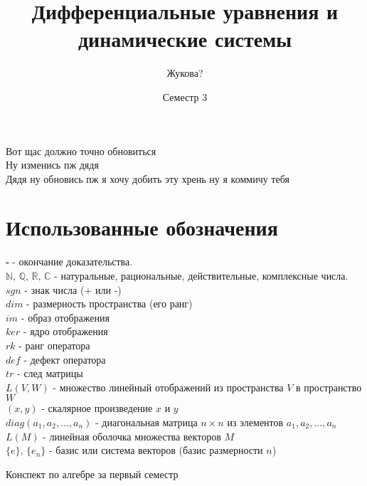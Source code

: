 \documentclass[a4paper]{book}
\title{Дифференциальные уравнения и динамические системы}
\date{Семестр 3}
\author{Жукова?}
\begin{document}
\maketitle
\tableofcontents
\newpage

Вот щас должно точно обновиться\\
Ну изменись пж дядя\\
Дядя ну обновись пж я хочу добить эту хрень ну я коммичу тебя\\
\section{Использованные обозначения}
$\square$ - окончание доказательства. \\
$\mathbb N,\,\mathbb Q,\,\mathbb R,\,\mathbb C$ - натуральные, рациональные,
действительные, комплексные числа.\\
$sgn$ - знак числа (+ или -)\\
$dim$ - размерность пространства (его ранг)\\
$im$ - образ отображения\\
$ker$ - ядро отображения\\
$rk$ - ранг оператора\\
$def$ - дефект оператора\\
$tr$ - след матрицы\\
$L(V,W)$ - множество линейный отображений из пространства $V$ в 
пространство $W$\\
$(x,y)$ - скалярное произведение $x$ и $y$\\
$diag(a_1,a_2,...,a_n)$ - диагональная матрица $n\times n$ из элементов
$a_1,a_2,...,a_n$\\
$L(M)$ - линейная оболочка множества векторов $M$\\
$\{e\}$, $\{e_n\}$ - базис или система векторов (базис размерности $n$)\\

\begin{thebibliography}{}
Конспект по алгебре за первый семестр
\end{thebibliography}
\end{document}
